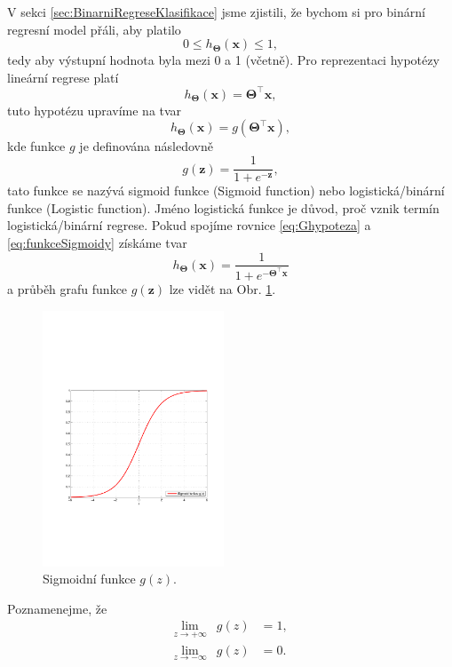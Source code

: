 \par{V sekci \ref{sec:BinarniRegreseKlasifikace} jsme zjistili, že bychom si pro binární regresní model přáli, aby platilo
\begin{equation}
	0 \leq h_{\bm{\Theta}} \left( \bm{x} \right) \leq 1,
\end{equation}
tedy aby výstupní hodnota byla mezi 0 a 1 (včetně). Pro reprezentaci hypotézy lineární regrese platí
\begin{equation}
	h_{\bm{\Theta}} \left( \bm{x} \right) = \bm{\Theta}^{\top} \bm{x},
\end{equation}
tuto hypotézu upravíme na tvar
\begin{equation}
	h_{\bm{\Theta}} \left( \bm{x} \right) = g \left( \bm{\Theta}^{\top} \bm{x} \right),
	\label{eq:Ghypoteza}
\end{equation}
kde funkce $g$ je definována následovně
\begin{equation}
	g \left( \bm{z} \right) = \frac{1}{1 + e^{-\bm{z}}},
	\label{eq:funkceSigmoidy}
\end{equation}
tato funkce se nazývá sigmoid funkce (Sigmoid function) nebo logistická/binární funkce (Logistic function). Jméno logistická funkce je důvod, proč vznik termín logistická/binární regrese. Pokud spojíme rovnice \ref{eq:Ghypoteza} a \ref{eq:funkceSigmoidy} získáme tvar
\begin{equation}
	h_{\bm{\Theta}} \left( \bm{x} \right) =  \frac{1}{1 + e^{- \bm{\Theta}^{\top} \bm{x}}} 
\end{equation}
a průběh grafu funkce $g \left( \bm{z} \right)$ lze vidět na Obr. \ref{fig:sigmoidFunction}.
\begin{figure}[!ht]
	\centering
	\includegraphics[width = 0.48\textwidth, trim = 2.5cm 7cm 2cm 9cm]{./Img/BinarniRegrese/sigmoidFunkce/sigmoidFunction.pdf}
	\caption{Sigmoidní funkce $g \left( z \right)$.}
	\label{fig:sigmoidFunction}
\end{figure}}
\par{Poznamenejme, že
\begin{eqnarray}
	\nonumber
	\lim_{z \to +\infty} &g \left( z \right) &= 1,\\
	\nonumber
	\lim_{z \to -\infty} &g \left( z \right) &= 0.
\end{eqnarray}}

